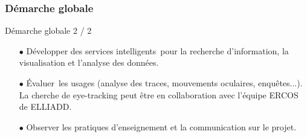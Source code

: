 \documentclass[xcolor=dvipsnames]{beamer}
\begin{document}
\begin{frame}[fragile]
\frametitle{Démarche globale}
\begin{block}{Démarche globale 2 / 2}
	\begin{itemize}
		\item[$\bullet$]Développer des services intelligents pour la recherche d'information, la visualisation et l'analyse des données.
		\item[$\bullet$]Évaluer les usages (analyse des traces, mouvements oculaires, enquêtes...). La cherche de eye-tracking peut être en collaboration avec l'équipe ERCOS de ELLIADD.
		\item[$\bullet$]Observer les pratiques d'enseignement et la communication sur le projet.
	\end{itemize}
\end{block}
\vspace{2cm}
\end{frame}
\end{document}
